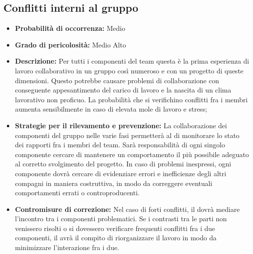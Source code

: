 \subsection{Conflitti interni al gruppo}
\begin{itemize}
\item \textbf{Probabilità di occorrenza:} Medio
\item \textbf{Grado di pericolosità:} Medio Alto
\item \textbf{Descrizione:} Per tutti i componenti del team questa è la prima esperienza di lavoro collaborativo in un gruppo così numeroso e con un progetto di queste dimensioni. Questo potrebbe causare problemi di collaborazione con conseguente appesantimento del carico di lavoro e la nascita di un clima lavorativo non proficuo. La probabilità che si verifichino conflitti fra i membri aumenta sensibilmente in caso di elevata mole di lavoro e stress;

\item \textbf{Strategie per il rilevamento e prevenzione:} La collaborazione dei componenti del gruppo nelle varie fasi permetterà al \ruoloResponsabile di monitorare lo stato dei rapporti fra i membri del team. Sarà responsabilità di ogni singolo componente cercare di mantenere un comportamento il più possibile adeguato al corretto svolgimento del progetto. In caso di problemi inespressi, ogni componente dovrà cercare di evidenziare errori e inefficienze degli altri compagni in maniera costruttiva, in modo da correggere eventuali comportamenti errati o controproducenti.

\item \textbf{Contromisure di correzione:} Nel caso di forti conflitti, il \ruoloResponsabile dovrà mediare l'incontro tra i componenti problematici. Se i contrasti tra le parti non venissero risolti o si dovessero verificare frequenti conflitti fra i due componenti, il \ruoloResponsabile avrà il compito di riorganizzare il lavoro in modo da minimizzare l'interazione fra i due.

\end{itemize}

